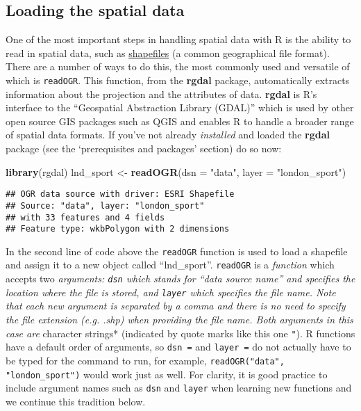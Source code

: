 \documentclass[]{article}
\newenvironment{Shaded}{}{}
\newcommand{\KeywordTok}[1]{\textcolor[rgb]{0.00,0.44,0.13}{\textbf{{#1}}}}
\newcommand{\DataTypeTok}[1]{\textcolor[rgb]{0.56,0.13,0.00}{{#1}}}
\newcommand{\StringTok}[1]{\textcolor[rgb]{0.25,0.44,0.63}{{#1}}}
\newcommand{\NormalTok}[1]{{#1}}
\begin{document}
\subsection{Loading the spatial data}\label{loading-the-spatial-data}

One of the most important steps in handling spatial data with R is the
ability to read in spatial data, such as
\href{http://en.wikipedia.org/wiki/Shapefile}{shapefiles} (a common
geographical file format). There are a number of ways to do this, the
most commonly used and versatile of which is \texttt{readOGR}. This
function, from the \textbf{rgdal} package, automatically extracts
information about the projection and the attributes of data.
\textbf{rgdal} is R's interface to the ``Geospatial Abstraction Library
(GDAL)'' which is used by other open source GIS packages such as QGIS
and enables R to handle a broader range of spatial data formats. If
you've not already \emph{installed} and loaded the \textbf{rgdal}
package (see the `prerequisites and packages' section) do so now:

\begin{Shaded}
\begin{Highlighting}[]
\KeywordTok{library}\NormalTok{(rgdal)}
\NormalTok{lnd_sport <-}\StringTok{ }\KeywordTok{readOGR}\NormalTok{(}\DataTypeTok{dsn =} \StringTok{"data"}\NormalTok{, }\DataTypeTok{layer =} \StringTok{"london_sport"}\NormalTok{)}
\end{Highlighting}
\end{Shaded}

\begin{verbatim}
## OGR data source with driver: ESRI Shapefile 
## Source: "data", layer: "london_sport"
## with 33 features and 4 fields
## Feature type: wkbPolygon with 2 dimensions
\end{verbatim}

In the second line of code above the \texttt{readOGR} function is used
to load a shapefile and assign it to a new object called ``lnd\_sport''.
\texttt{readOGR} is a \emph{function} which accepts two \emph{arguments:
\texttt{dsn} which stands for ``data source name'' and specifies the
location where the file is stored, and \texttt{layer} which specifies
the file name. Note that each new argument is separated by a comma and
there is no need to specify the file extension (e.g. .shp) when
providing the file name. Both arguments in this case are }character
strings* (indicated by quote marks like this one \texttt{"}). R
functions have a default order of arguments, so \texttt{dsn =} and
\texttt{layer =} do not actually have to be typed for the command to
run, for example, \texttt{readOGR("data", "london\_sport")} would work
just as well. For clarity, it is good practice to include argument names
such as \texttt{dsn} and \texttt{layer} when learning new functions and
we continue this tradition below.
\end{document}
